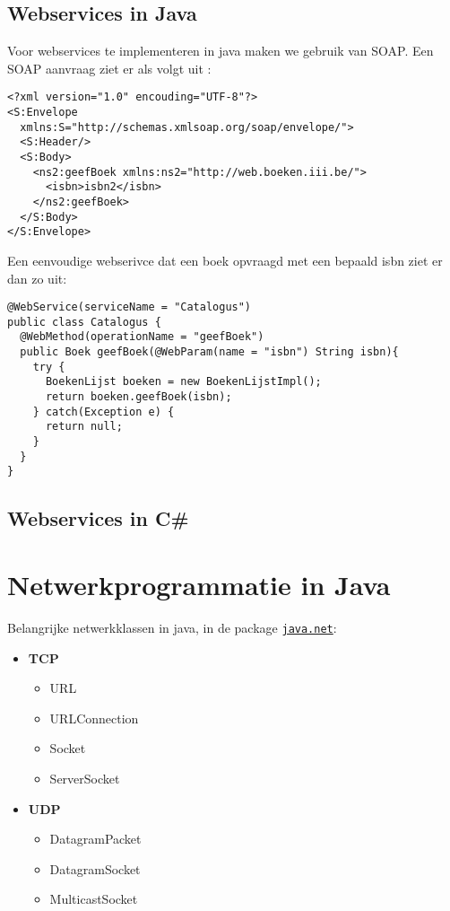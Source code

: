 \documentclass{report}
\begin{document}
\section{Webservices in Java}
Voor webservices te implementeren in java maken we gebruik van SOAP. Een SOAP aanvraag ziet er als volgt uit :
\begin{lstlisting}
<?xml version="1.0" encouding="UTF-8"?>
<S:Envelope 
  xmlns:S="http://schemas.xmlsoap.org/soap/envelope/">
  <S:Header/>
  <S:Body>
    <ns2:geefBoek xmlns:ns2="http://web.boeken.iii.be/">
      <isbn>isbn2</isbn>
    </ns2:geefBoek>
  </S:Body>
</S:Envelope>
\end{lstlisting}

Een eenvoudige webserivce dat een boek opvraagd met een bepaald isbn ziet er dan zo uit:
\begin{lstlisting}
@WebService(serviceName = "Catalogus")
public class Catalogus {
  @WebMethod(operationName = "geefBoek")
  public Boek geefBoek(@WebParam(name = "isbn") String isbn){
    try {
      BoekenLijst boeken = new BoekenLijstImpl();
      return boeken.geefBoek(isbn);
    } catch(Exception e) {
      return null;
    }
  }
}
\end{lstlisting}
\section{Webservices in C\#}

\chapter{Netwerkprogrammatie in Java}
Belangrijke netwerkklassen in java, in de package \underline{\texttt{java.net}}:
\begin{itemize}
    \item \textbf{TCP} 
        \begin{itemize}
            \item URL
            \item URLConnection
            \item Socket
            \item ServerSocket
        \end{itemize}
    \item \textbf{UDP}
        \begin{itemize}
            \item DatagramPacket
            \item DatagramSocket
            \item MulticastSocket
        \end{itemize}
\end{itemize}
\end{document}
